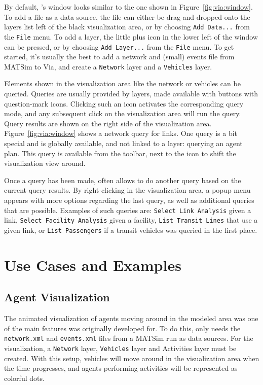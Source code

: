 By default, \Via{}'s window looks similar to the one shown in Figure~\ref{fig:via:window}.
To add a file as a data source, the file can either be drag-and-dropped onto the layers
list left of the black visualization area, or by choosing \lstinline|Add Data...|
from the \lstinline|File| menu. To add a layer, the little plus icon in the lower left of
the window can be pressed, or by choosing \lstinline|Add Layer...| from the \lstinline|File|
menu. To get started, it's usually the best to add a network and (small) events
file from MATSim to Via, and create a \lstinline|Network| layer and a \lstinline|Vehicles| layer.

Elements shown in the visualization area like the network or vehicles can
be queried. Queries are usually provided by layers, made available with buttons
with question-mark icons. Clicking such an icon activates the corresponding
query mode, and any subsequent click on the visualization area will run the
query.
Query results are shown on the right side of the visualization area.
Figure~\ref{fig:via:window} shows a network query for links.
One query is a bit special and is globally available, and not linked to a
layer: querying an agent plan. This query is available from the toolbar, next to
the icon to shift the visualization view around.

Once a query has been made, \Via{} often allows to do another query based on the
current query results. By right-clicking in the visualization area, a popup menu
appears with more options regarding the last query, as well as additional
queries that are possible. Examples of such queries are: \lstinline|Select Link Analysis|
given a link, \lstinline|Select Facility Analysis| given a facility, \lstinline|List Transit Lines| that
use a given link, or \lstinline|List Passengers| if a transit vehicles was queried in the
first place.

\section{Use Cases and Examples}
\subsection{Agent Visualization}
The animated visualization of agents moving around in the modeled area was one
of the main features \Via{} was originally developed for. To do this, \Via{}
only needs the \lstinline|network.xml| and \lstinline|events.xml| files from a MATSim run
as data sources. For the visualization, a \lstinline|Network| layer, \lstinline|Vehicles| layer and
Activities layer must be created. With this setup, vehicles will move around in
the visualization area when the time progresses, and agents performing
activities will be represented as colorful dots.

